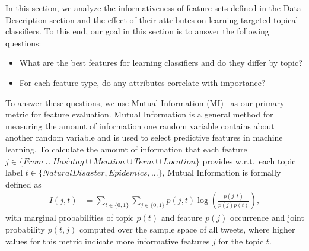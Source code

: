 In this section, we analyze the informativeness of feature sets defined in the Data Description section and the effect of their
attributes on learning targeted topical classifiers. To this end,
our goal in this section is to answer the following questions:
\begin{itemize}
\item What are the best features for learning classifiers and do they differ by topic?
\item For each feature type, do any attributes correlate with importance?
\end{itemize}
To answer these questions, we use Mutual Information (MI)~\cite{manning_ir} as our primary
metric for feature evaluation.  Mutual Information is a general method
for measuring the amount of information one random variable contains
about another random variable and is used to select
predictive features in machine learning.  To calculate the amount of
information that each feature
$j \in \{ \textit{From} \cup \textit{Hashtag} \cup \textit{Mention} \cup \textit{Term} \cup \textit{Location} \}$
provides w.r.t.\ each topic label $t \in \{NaturalDisaster, Epidemics,...\}$,
Mutual Information is formally defined as 
\begin{align*}
I(j, t) & = \!\!\! \sum_{t \in \{ \mathrm{0}, \mathrm{1} \}} \sum_{j \in \{ \mathrm{0}, \mathrm{1}\}}p(j,t)\log \left ( \frac{p(j,t)}{p(j)p(t)} \right ) , 
 \label{eq:eq1}
\end{align*}
with marginal probabilities of topic $p(t)$ and feature $p(j)$ occurrence and joint probability $p(t,j)$ computed over the sample space of all tweets, 
where higher values for this metric indicate more informative features $j$ for the topic $t$.

